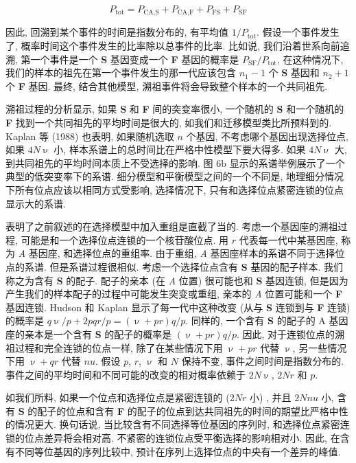 \documentclass[12pt]{article}
\begin{document}
\begin{equation*}
    P_{\text{tot}} = P_{\text{CA},\text{S}} + P_{\text{CA},\text{F}} + P_{\text{FS}} + P_{\text{SF}}
\end{equation*}

因此, 回溯到某个事件的时间是指数分布的, 有平均值 $1/P_{\text{tot}}$. 假设一个事件发生了,
概率时间这个事件发生的比率除以总事件的比率. 比如说, 我们沿着世系向前追溯,
第一个事件是一个 \textbf{S} 基因变成一个 \textbf{F} 基因的概率是 $P_{\text{SF}}/P_{\text{tot}}$,
在这种情况下, 我们的样本的祖先在第一个事件发生的那一代应该包含 $n_{1}-1$ 个 \textbf{S} 基因和 $n_{2}+1$
个 \textbf{F} 基因. 最终, 结合其他模型, 溯祖事件将会导致整个样本的一个共同祖先.

溯祖过程的分析显示, 如果 \textbf{S} 和 \textbf{F} 间的突变率很小,
一个随机的 \textbf{S} 和一个随机的 \textbf{F} 找到一个共同祖先的平均时间是很大的, 如我们和迁移模型类比所预料到的. Kaplan
等 (1988) 也表明, 如果随机选取 $n$ 个基因, 不考虑哪个基因出现选择位点, 如果 $4N\upnu$ 小,
样本系谱上的总时间比在严格中性模型下要大得多. 如果 $4N\upnu$ 大, 到共同祖先的平均时间本质上不受选择的影响. 图 6b
显示的系谱举例展示了一个典型的低突变率下的系谱. 细分模型和平衡模型之间的一个不同是,
地理细分情况下所有位点应该以相同方式受影响, 选择情况下, 只有和选择位点紧密连锁的位点显示大的系谱.

\textcite{hudson1988} 表明了之前叙述的在选择模型中加入重组是直截了当的. 考虑一个基因座的溯祖过程,
可能是和一个选择位点连锁的一个核苷酸位点. 用 $r$ 代表每一代中某基因座, 称为 \textit{A} 基因座, 和选择位点的重组率.
由于重组, \textit{A} 基因座样本的系谱不同于选择位点的系谱. 但是系谱过程很相似.
考虑一个选择位点含有 \textbf{S} 基因的配子样本. 我们称之为含有 \textbf{S} 的配子. 配子的亲本 (在 \textit{A} 位置)
很可能也和 \textbf{S} 基因连锁, 但是因为产生我们的样本配子的过程中可能发生突变或重组,
亲本的 \textit{A} 位置可能和一个 \textbf{F} 基因连锁. Hudson 和 Kaplan 显示了每一代中这种改变
(从与 \textbf{S} 连锁到与 \textbf{F} 连锁) 的概率是 $q\upnu/p+2pqr/p=(\upnu+pr)q/p$. 同样的,
一个含有 \textbf{S} 的配子的 A 基因座的亲本是一个含有 \textbf{S} 的配子的概率是 $(\upnu+pr)q/p$. 因此,
对于连锁位点的溯祖过程和完全连锁的位点一样, 除了在某些情况下用 $\upnu+pr$ 代替 $\upnu$, 另一些情况下用 $\upnu+qr$ 代替 $nu
$. 假设 $p$, $r$, $\upnu$ 和 $N$ 保持不变, 事件之间时间是指数分布的. 事件之间的平均时间和不同可能的改变的相对概率依赖于
$2N\upnu$, $2Nr$ 和 $p$.

如我们所料, 如果一个位点和选择位点是紧密连锁的 ($2Nr$ 小) , 并且 $2Nnu$ 小,
含有 \textbf{S} 的配子的位点和含有 \textbf{F} 的配子的位点到达共同祖先的时间的期望比严格中性的情况更大. 换句话说,
当比较含有不同选择等位基因的序列时, 和选择位点紧密连锁的位点差异将会相对高. 不紧密的连锁位点受平衡选择的影响相对小. 因此,
在含有不同等位基因的序列比较中, 预计在序列上选择位点的中央有一个差异的峰值.
\end{document}
